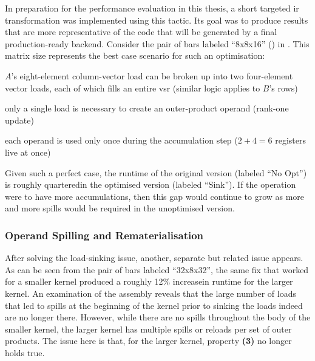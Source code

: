 \documentclass[\main/thesis.tex]{subfiles}
\begin{document}
In preparation for the performance evaluation in this thesis, a short targeted \gls{ir} transformation was implemented using this tactic.
Its goal was to produce results that are more representative of the code that will be generated by a final production-ready backend.
Consider the pair of bars labeled ``8x8x16'' () in .
This matrix size represents the best case scenario for such an optimisation:
\begin{enumerate*}[itemjoin={{; }}, itemjoin*={{; and }}, label=\textbf{(\arabic*)}, after={.}]
  \item $A$'s eight-element column-vector load can be broken up into two four-element vector loads, each of which fills an entire \gls{vsr} (similar logic applies to $B$'s rows)
  \item only a single load is necessary to create an outer-product operand (rank-one update)
  \item each operand is used only once during the accumulation step ($2+4=6$ registers \gls{live} at once)
\end{enumerate*}
Given such a perfect case, the runtime of the original version (labeled ``No Opt'') is roughly quartered\footnotemark in the optimised version (labeled ``Sink'').
If the operation were to have more accumulations, then this gap would continue to grow as more and more spills would be required in the unoptimised version.

\subsubsection{Operand Spilling and Rematerialisation}
After solving the load-sinking issue, another, separate but related issue appears.
As can be seen from the pair of bars labeled ``32x8x32'', the same fix that worked for a smaller kernel produced a roughly 12\% increase\footnotemark in runtime for the larger kernel.
An examination of the assembly reveals that the large number of loads that led to spills at the beginning of the kernel prior to sinking the loads indeed are no longer there.
However, while there are no spills throughout the body of the smaller kernel, the larger kernel has multiple spills or reloads per set of outer products.
The issue here is that, for the larger kernel, property \textbf{(3)} no longer holds true.
\end{document}
